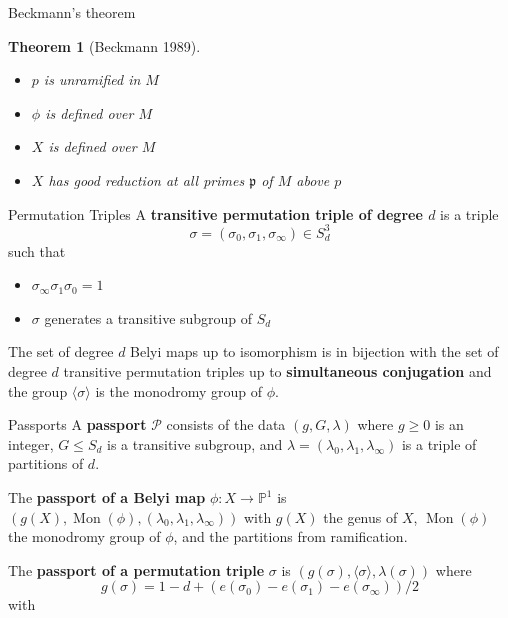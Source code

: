 \documentclass[xcolor=dvipsnames]{beamer}
\theoremstyle{plain}
\newtheorem*{thm}{Theorem}
\newcommand{\PP}{\mathbb P}
\DeclareMathOperator{\Mon}{Mon}
\begin{document}
{\begin{frame}{Beckmann's theorem}
\begin{thm}[Beckmann 1989]
        \pause
        \begin{itemize}
          \item
            $p$ is unramified in $M$
          \item
            $\phi$ is defined over $M$
          \item
            $X$ is defined over $M$
          \item
            $X$ has good reduction at all
            primes $\mathfrak{p}$ of $M$
            above $p$
        \end{itemize}
      \end{thm}
    \end{frame}
    \begin{frame}{Permutation Triples}
      A \textbf{transitive permutation triple of degree $d$} is a triple
      \[
        \sigma = (\sigma_0, \sigma_1, \sigma_\infty)\in S_d^3
      \]
      such that
      \begin{itemize}
        \item
          $\sigma_\infty\sigma_1\sigma_0=1$
        \item
          $\sigma$ generates a transitive subgroup of $S_d$
      \end{itemize}
      \pause
      The set of degree $d$ Belyi maps up to isomorphism is in bijection with the
      set of degree $d$ transitive permutation triples up to
      \textbf{simultaneous conjugation} and
      the group $\langle\sigma\rangle$ is the monodromy group of $\phi$.
    \end{frame}
    \begin{frame}{Passports}
      A \textbf{passport} $\mathcal{P}$ consists of the data
      $(g,G,\lambda)$ where $g\geq 0$ is an integer,
      $G\leq S_d$ is a transitive subgroup,
      and $\lambda = (\lambda_0,\lambda_1,\lambda_\infty)$
      is a triple of partitions of $d$.
      \pause
      \par
      The \textbf{passport of a Belyi map} $\phi:X\to\PP^1$
      is $(g(X), \Mon(\phi), (\lambda_0,\lambda_1,\lambda_\infty))$
      with $g(X)$ the genus of $X$,
      $\Mon(\phi)$ the monodromy group of $\phi$,
      and the partitions from ramification.
      \pause
      \par
      The \textbf{passport of a permutation triple} $\sigma$ is
      $(g(\sigma), \langle\sigma\rangle, \lambda(\sigma))$
      where
      $$
      g(\sigma) = 1-d+(e(\sigma_0)-e(\sigma_1)-e(\sigma_\infty))/2
      $$
      with

\end{frame}}
\end{document}
